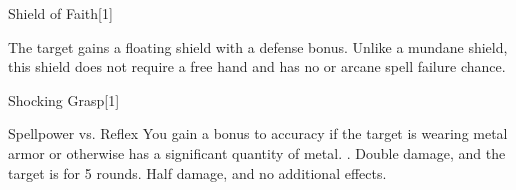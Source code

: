 \begin{spellsection}{Shield of Faith}[1]
    \begin{spellheader}
    \end{spellheader}
    \begin{spellcontent}
        \begin{spelltargetinginfo}
        \end{spelltargetinginfo}
        \begin{spelleffects}
            \spelleffect The target gains a floating shield with a  defense bonus. Unlike a mundane shield, this shield does not require a free hand and has no  or arcane spell failure chance.
            \spelldur \durpersonallong
        \end{spelleffects}
    \end{spellcontent}
    \begin{spellfooter}
        \miscastexplode
    \end{spellfooter}
\end{spellsection}

\begin{spellsection}{Shocking Grasp}[1]
    \begin{spellheader}
    \end{spellheader}
    \begin{spellcontent}
        \begin{spelltargetinginfo}
        \end{spelltargetinginfo}
        \begin{spelleffects}
            \begin{spellattack}{Spellpower vs. Reflex}
                \spellspecial You gain a  bonus to accuracy if the target is wearing metal armor or otherwise has a significant quantity of metal.
                \spellsuccess {}.
                \spellcritical Double damage, and the target is \staggered for 5 rounds.
                \spellfailure Half damage, and no additional effects.
            \end{spellattack}
        \end{spelleffects}
    \end{spellcontent}
    \begin{spellfooter}
        \miscastexplode
    \end{spellfooter}
\end{spellsection}

